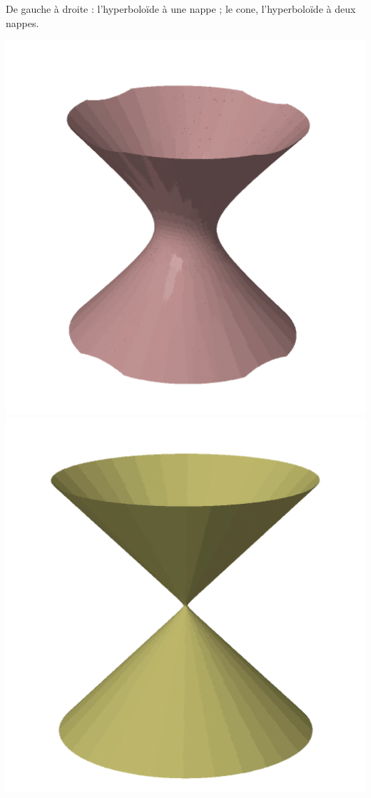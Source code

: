 \documentclass[12pt, class=report,crop=false]{standalone}
\begin{document}
\begin{exemple}
\begin{itemize}
\begin{itemize}
    \end{itemize}
    
\end{itemize}  

De gauche à droite : l'hyperboloïde à une nappe ; le cone, l'hyperboloïde à deux nappes.

\begin{center}
  \includegraphics[scale=0.25]{figures/fig-gradient-06d}
  \includegraphics[scale=0.23]{figures/fig-gradient-06c}  

\end{center}
\end{exemple}
\end{document}
